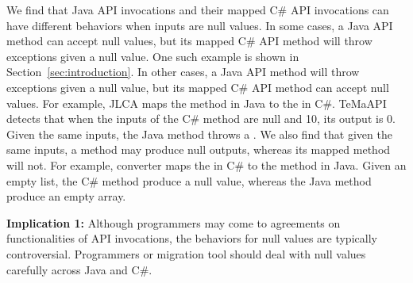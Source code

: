 We find that Java API invocations and their mapped C\# API invocations can have different behaviors when inputs are null values. In some cases, a Java API method can accept null values, but its mapped C\# API method will throw exceptions given a null value. One such example is shown in Section~\ref{sec:introduction}. In other cases, a Java API method will throw exceptions given a null value, but its mapped C\# API method can accept null values. For example, JLCA maps the  method in Java to the  in C\#. TeMaAPI detects that when the inputs of the C\# method are null and 10, its output is 0. Given the same inputs, the Java method throws a . We also find that given the same inputs, a method may produce null outputs, whereas its mapped method will not. For example, converter maps the  in C\# to the  method in Java. Given an empty list, the C\# method produce a null value, whereas the Java method produce an empty array.


\textbf{Implication 1:} Although programmers may come to agreements on functionalities of API invocations, the behaviors for null values are typically controversial. Programmers or migration tool should deal with null values carefully across Java and C\#.


